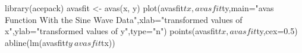 \begin{Schunk}
\begin{Sinput}
 library(acepack)
 avasfit <- avas(x, y)
 plot(avasfit$tx, avasfit$ty,main="avas Function With the Sine Wave Data",xlab="transformed values of x",ylab="transformed values of y",type="n")
 points(avasfit$tx, avasfit$ty,cex=0.5)
 abline(lm(avasfit$ty~avasfit$tx))
\end{Sinput}
\end{Schunk}
